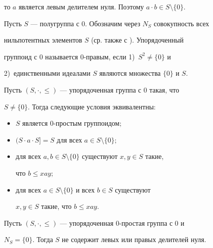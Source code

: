 то $a$ является левым делителем нуля. Поэтому $a\cdot b\in 


S\setminus\{0\}$. 


 


Пусть $S$ --- полугруппа с 0. Обозначим через $N_S$ совокупность всех 


нильпотентных элементов $S$ (ср. также с \cite{3}). Упорядоченный 


группоид с 0 называется 0-правым, если 1)~$S^2\ne\{0\}$ и 


2)~единственными идеалами $S$ являются множества $\{0\}$ и $S$. 


 


\begin{lemnonum} 


Пусть $(S,\cdot,\le)$ --- упорядоченная группа с $0$ такая, что 


$S\ne\{0\}$. Тогда следующие условия эквивалентны\/${:}$ 


\begin{itemize} 


\item[1)] $S$ является $0$-простым группоидом\/$;$ 


\item[2)] $(S\cdot a\cdot S]=S$ для всех $a\in S\setminus\{0\};$ 


\item[3)] для всех $a,b\in S\setminus\{0\}$ существуют $x,y\in S$ такие, 


что $b\le xay;$ 


\item[4)] для всех $a\in S\setminus\{0\}$ и всех $b\in S$ существуют 


$x,y\in S$ такие, что $b\le xay$. 


\end{itemize} 


\end{lemnonum} 


 


\begin{prop} 


Пусть $(S,\cdot,\le)$ --- упорядоченная $0$-простая группа с $0$ и


$N_S=\{0\}$. Тогда $S$ не содержит левых или правых делителей нуля. 


\end{prop} 


